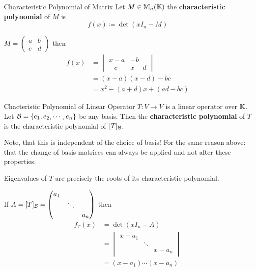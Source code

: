 \begin{definition} {Characteristic Polynomial of Matrix}
    Let \(M \in \mathbb{M}_n(\mathbb{K})\) the \textbf{characteristic polynomial} of \(M\) is \[
        f(x) \coloneqq \det(x I_n - M)
    \]
\end{definition}

\begin{example}
    \(M = \begin{pmatrix}
        a & b \\
        c & d
    \end{pmatrix}\) then \begin{align*}
        f(x) & = \begin{vmatrix}
                     x -a & -b  \\
                     -c   & x-d
                 \end{vmatrix}         \\
             & = (x-a)(x-d) - bc        \\
             & = x^2 - (a+d)x + (ad-bc)
    \end{align*}
\end{example}

\begin{definition} {Chacteristic Polynomial of Linear Operator}
    \(T: V \to V\) is a linear operator over \(\mathbb{K}\). Let \(\mathcal{B} = \{e_1, e_2, \cdots, e_n\}\) be any basis. Then the \textbf{characteristic polynomial} of \(T\) is the characteristic polynomial of \([T]_{\mathcal{B}}\).
\end{definition}

\begin{remark}
    Note, that this is independent of the choice of basis! For the same reason above: that the change of basis matrices can always be applied and not alter these properties.
\end{remark}

\begin{corollary}
    Eigenvalues of \(T\) are precisely the roots of its characteristic polynomial.
\end{corollary}

\begin{example}
    If \(A= [T]_{\mathcal{B}} = \begin{pmatrix}
        a_1 &        &     \\
            & \ddots &     \\
            &        & a_n
    \end{pmatrix}\) then \begin{align*}
        f_T(x) & = \det(xI_n - A)             \\
               & = \begin{vmatrix}
                       x - a_1 &        &         \\
                               & \ddots &         \\
                               &        & x - a_n
                   \end{vmatrix} \\
               & = (x-a_1)\cdots (x-a_n)
    \end{align*}
\end{example}

